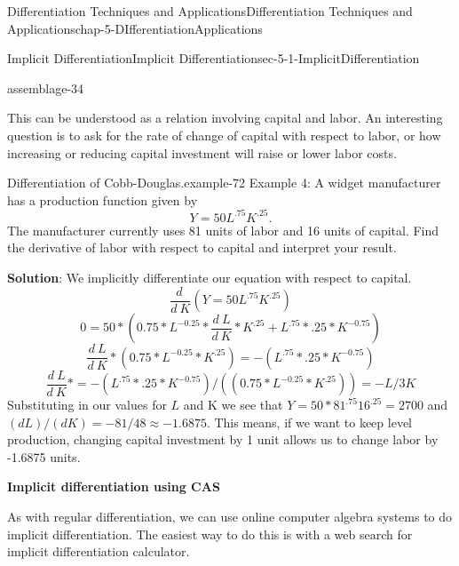 \documentclass[oneside,10pt,]{book}
\newcommand{\terminology}[1]{\textbf{#1}}
\numberwithin{equation}{section}
\begin{document}
\begin{chapterptx}{Differentiation Techniques and Applications}{}{Differentiation Techniques and Applications}{}{}{chap-5-DIfferentiationApplications}
\begin{sectionptx}{Implicit Differentiation}{}{Implicit Differentiation}{}{}{sec-5-1-ImplicitDifferentiation}
\begin{assemblage}{}{assemblage-34}
\end{assemblage}
\hypertarget{p-1886}{}%
This can be understood as a relation involving capital and labor.  An interesting question is to ask for the rate of change of capital with respect to labor, or how increasing or reducing capital investment will raise or lower labor costs.%
\begin{example}{Differentiation of Cobb-Douglas.}{example-72}%
\hypertarget{p-1887}{}%
Example 4:  A widget manufacturer has a production function given by%
%
\begin{equation*}
Y=50L^.75 K^.25.
\end{equation*}
\hypertarget{p-1888}{}%
The manufacturer currently uses 81 units of labor and 16 units of capital.  Find the derivative of labor with respect to capital and interpret your result.%
\par
\hypertarget{p-1889}{}%
\terminology{Solution}: We implicitly differentiate our equation with respect to capital.%
%
\begin{equation*}
\frac{d\ }{d\ K}(Y=50L^{.75} K^{.25})
\end{equation*}
%
\begin{equation*}
0=50*(0.75*L^{-0.25}*\frac{d\ L}{d\ K}*K^{.25}+L^{.75}*.25*K^{-0.75} )
\end{equation*}
%
\begin{equation*}
\frac{d\ L}{d\ K}*(0.75*L^{-0.25}*K^{.25} )=-(L^{.75}*.25*K^{-0.75})
\end{equation*}
%
\begin{equation*}
\frac{d\ L}{d\ K}*=-(L^{.75}*.25*K^{-0.75})/((0.75*L^{-0.25}*K^{.25} ) )=-L/3K
\end{equation*}
\hypertarget{p-1890}{}%
Substituting in our values for \(L\) and K we see that \(Y=50*81^{.75} 16^{.25}=2700\) and \((d L)/(d K)=-81/48\approx-1.6875\).  This means, if we want to keep level production, changing capital investment by 1 unit allows us to change labor by -1.6875 units.%
\end{example}
\hypertarget{p-1891}{}%
\terminology{Implicit differentiation using CAS}%
\par
\hypertarget{p-1892}{}%
As with regular differentiation, we can use online computer algebra systems to do implicit differentiation.  The easiest way to do this is with a web search for implicit differentiation calculator.%
\begin{sidebyside}{1}{0}{0}{0}%
\begin{sbspanel}{1}%

\end{sbspanel}
\end{sidebyside}
\end{sectionptx}
\end{chapterptx}
\end{document}
